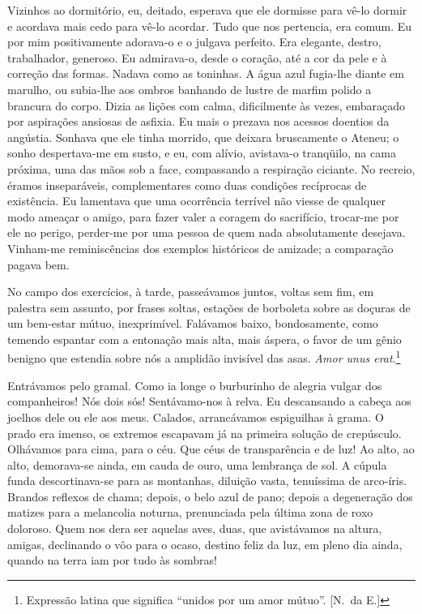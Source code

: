 Vizinhos ao dormitório, eu, deitado, esperava que ele dormisse
para vê{}-lo dormir e acordava mais cedo para vê{}-lo acordar. Tudo que
nos pertencia, era comum. Eu por mim positivamente adorava{}-o e o
julgava perfeito. Era elegante, destro, trabalhador, generoso. Eu
admirava{}-o, desde o coração, até a cor da pele e à correção das
formas. Nadava como as toninhas. A água azul fugia{}-lhe diante em
marulho, ou subia{}-lhe aos ombros banhando de lustre de marfim polido
a brancura do corpo. Dizia as lições com calma, dificilmente às vezes,
embaraçado por aspirações ansiosas de asfixia. Eu mais o prezava nos
acessos doentios da angústia. Sonhava que ele tinha morrido, que
deixara bruscamente o Ateneu; o sonho despertava{}-me em susto, e eu,
com alívio, avistava{}-o tranqüilo, na cama próxima, uma das mãos sob a
face, compassando a respiração ciciante. No recreio, éramos
inseparáveis, complementares como duas condições recíprocas de
existência. Eu lamentava que uma ocorrência terrível não viesse de
qualquer modo ameaçar o amigo, para fazer valer a coragem do
sacrifício, trocar{}-me por ele no perigo, perder{}-me por uma pessoa
de quem nada absolutamente desejava. Vinham{}-me reminiscências dos
exemplos históricos de amizade; a comparação pagava bem. 

No campo dos exercícios, à tarde, passeávamos juntos, voltas sem fim, em palestra
sem assunto, por frases soltas, estações de borboleta sobre as doçuras
de um bem{}-estar mútuo, inexprimível. Falávamos baixo, bondosamente,
como temendo espantar com a entonação mais alta, mais áspera, o favor
de um gênio benigno que estendia sobre nós a amplidão invisível das
asas. \textit{Amor unus erat}.\footnote{ Expressão latina que significa 
``unidos por um amor mútuo''. [N.~da E.]} 

Entrávamos pelo gramal. Como ia longe o
burburinho de alegria vulgar dos companheiros! Nós dois sós!
Sentávamo{}-nos à relva. Eu descansando a cabeça aos joelhos dele ou
ele aos meus. Calados, arrancávamos espiguilhas à grama. O prado era
imenso, os extremos escapavam já na primeira solução de crepúsculo.
Olhávamos para cima, para o céu. Que céus de transparência e de luz! Ao
alto, ao alto, demorava{}-se ainda, em cauda de ouro, uma lembrança de
sol. A cúpula funda descortinava{}-se para as montanhas, diluição
vasta, tenuíssima de arco{}-íris. Brandos reflexos de chama; depois, o
belo azul de pano; depois a degeneração dos matizes para a melancolia
noturna, prenunciada pela última zona de roxo doloroso. Quem nos dera
ser aquelas aves, duas, que avistávamos na altura, amigas, declinando o
vôo para o ocaso, destino feliz da luz, em pleno dia ainda, quando na
terra iam por tudo às sombras! 

